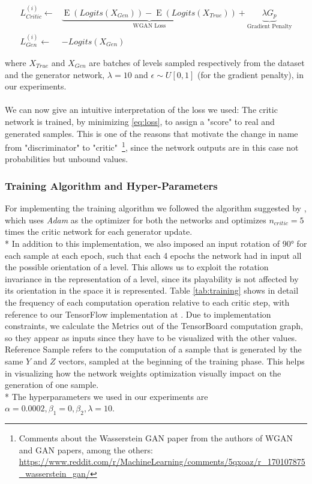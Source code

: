\begin{equation}
\label{eq:loss}
\begin{split}
L_{Critic}^{(i)} \gets & \underbrace{\operatorname{E}(Logits(X_{Gen})) - \operatorname{E}(Logits(X_{True}))}_{\text{WGAN Loss}} + \underbrace {\lambda G_p}_{\text{Gradient Penalty}} \\
L_{Gen}^{(i)} \gets & -Logits(X_{Gen}) 
\end{split}
\end{equation}

where $X_{True}$ and $X_{Gen}$ are batches of levels sampled respectively from the dataset and the generator network, $\lambda = 10$ and $ \epsilon \sim U[0,1] $ (for the gradient penalty), in our experiments.

\paragraph{} We can now give an intuitive interpretation of the loss we used: The critic network is trained, by minimizing \ref{eq:loss}, to assign a "score" to real and generated samples. This is one of the reasons that motivate the change in name from "discriminator" to "critic"~\footnote{ Comments about the Wasserstein GAN paper from the authors of WGAN and GAN papers, among the others: \url{https://www.reddit.com/r/MachineLearning/comments/5qxoaz/r_170107875_wasserstein_gan/}}, since the network outputs are in this case not probabilities but unbound values.

\subsubsection{Training Algorithm and Hyper-Parameters}
For implementing the training algorithm we followed the algorithm suggested by \cite[alg.~1. p.~4]{wgangp}, which uses \textit{Adam}\cite{adam} as the optimizer for both the networks and optimizes $n_{critic} = 5$ times the critic network for each generator update. \\*
In addition to this implementation, we also imposed an input rotation of 90° for each sample at each epoch, such that each 4 epochs the network had in input all the possible orientation of a level. This allows us to exploit the rotation invariance in the representation of a level, since its playability is not affected by its orientation in the space it is represented. Table \ref{tab:training} shows in detail the frequency of each computation operation relative to each critic step, with reference to our TensorFlow implementation at \cite{gitrepo}. Due to implementation constraints, we calculate the Metrics out of the TensorBoard computation graph, so they appear as inputs since they have to be visualized with the other values. Reference Sample refers to the computation of a sample that is generated by the same $Y$ and $Z$ vectors, sampled at the beginning of the training phase. This helps in visualizing how the network weights optimization visually impact on the generation of one sample. \\*
The hyperparameters we used in our experiments are $\alpha=0.0002, \beta_1=0, \beta_2, \lambda=10$.

